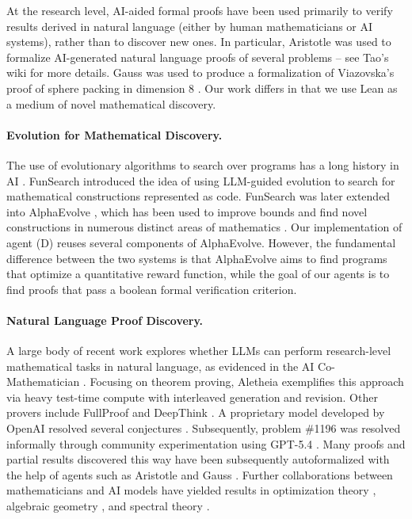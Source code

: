 At the research level, AI-aided formal proofs have been used primarily to verify results derived in natural language (either by human mathematicians or AI systems), rather than to discover new ones. In particular, Aristotle \cite{achim2025aristotle} was used to formalize AI-generated natural language proofs of several {\erdos} problems -- see Tao's wiki \cite{TaoErdosWiki} for more details. Gauss \cite{mathinc2026gauss} 
was used to produce a formalization of Viazovska's proof of sphere packing in dimension 8 \cite{hariharan2026milestone}. Our work differs in that we use Lean as a medium of novel mathematical discovery.

\paragraph{Evolution for Mathematical Discovery.}
The use of evolutionary algorithms to search over programs has a long history in AI \cite{koza1994genetic}.  FunSearch \cite{Romera-Paredes2024} introduced the idea of using LLM-guided evolution to search for mathematical constructions represented as code. FunSearch was later extended into AlphaEvolve \cite{novikov2025alphaevolve}, which has been used to improve bounds and
find novel constructions in numerous distinct areas of mathematics \cite{georgiev2025mathematical,nagda2026reinforced, nagda2025reinforced}.
Our implementation of agent (D) reuses several components of AlphaEvolve. However, the fundamental difference between the two systems is that AlphaEvolve aims to find programs that optimize a quantitative reward function, while the goal of our agents is to find proofs that pass a boolean formal verification criterion.

\paragraph{Natural Language Proof Discovery.} 
A large body of recent work explores whether LLMs can perform research-level mathematical tasks in natural language, as evidenced in the AI Co-Mathematician \cite{zheng2026aicomathematician}. Focusing on theorem proving, Aletheia \cite{feng2026autonomous} exemplifies this approach via heavy test-time compute with interleaved
generation and revision. Other provers include FullProof \cite{bryan2026motivic} and DeepThink \cite{deepmind2026deepthink}. A proprietary model developed by OpenAI resolved several {\erdos} conjectures 
\cite{alexeev2026short,alexeev2026short2}. Subsequently, {\erdos} problem \#1196 was resolved informally through community experimentation using GPT-5.4 \cite{alexeev2026primitivesetsvonmangoldt}.
Many proofs and partial results discovered this way have been subsequently autoformalized with the help of agents such as Aristotle \cite{achim2025aristotle} and Gauss \cite{mathinc2026gauss}. Further collaborations between mathematicians and AI models have yielded
results in optimization theory \cite{jang2025point}, algebraic geometry \cite{schmitt2025extremal,bryan2026motivic}, and spectral
theory \cite{jain2026equality}.

